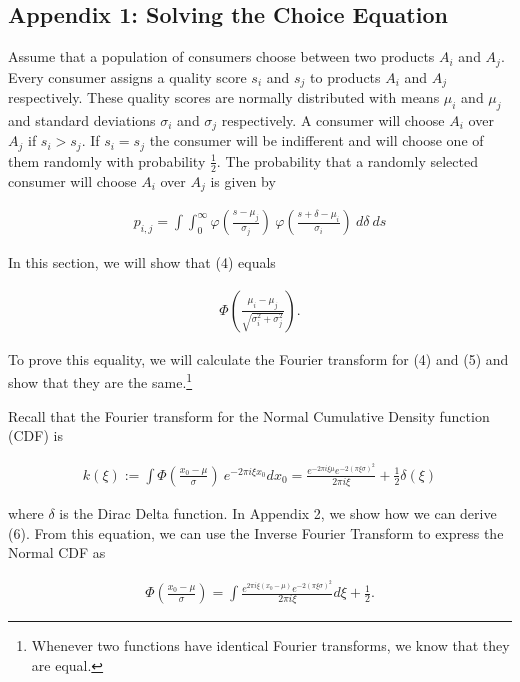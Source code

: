 \documentclass[]{article}
\begin{document}
\hypertarget{appendix-1-solving-the-choice-equation}{%
\subsection{Appendix 1: Solving the Choice
Equation}\label{appendix-1-solving-the-choice-equation}}

Assume that a population of consumers choose between two products
\(A_i\) and \(A_j\). Every consumer assigns a quality score \(s_i\) and
\(s_j\) to products \(A_i\) and \(A_j\) respectively. These quality
scores are normally distributed with means \(\mu_i\) and \(\mu_j\) and
standard deviations \(\sigma_i\) and \(\sigma_j\) respectively. A
consumer will choose \(A_i\) over \(A_j\) if \(s_i > s_j\). If
\(s_i = s_j\) the consumer will be indifferent and will choose one of
them randomly with probability \(\frac{1}{2}\). The probability that a
randomly selected consumer will choose \(A_i\) over \(A_j\) is given by

\begin{align}
p_{i,j} = \int \int_0^{\infty} \varphi(\frac{s - \mu_j}{\sigma_j})\ \varphi (\frac{s + \delta - \mu_i}{\sigma_i})\ d\delta\ ds
\end{align}

In this section, we will show that (4) equals

\begin{align}
\Phi (\frac{\mu_i - \mu_j}{\sqrt{\sigma_i^2 + \sigma_j^2}}).
\end{align}

To prove this equality, we will calculate the Fourier transform for (4)
and (5) and show that they are the same.\footnote{Whenever two functions
  have identical Fourier transforms, we know that they are equal. }

Recall that the Fourier transform for the Normal Cumulative Density
function (CDF) is

\begin{align}
k(\xi) := \int \Phi (\frac{x_0 - \mu}{\sigma})\ e^{-2 \pi i \xi x_0} d x_0 = \frac{e^{-2 \pi i \xi \mu} e^{-2(\pi \xi \sigma)^2}}{2 \pi i \xi} + \frac{1}{2}\delta(\xi)
\end{align}

where \(\delta\) is the Dirac Delta function. In Appendix 2, we show how
we can derive (6). From this equation, we can use the Inverse Fourier
Transform to express the Normal CDF as

\begin{align}
\Phi (\frac{x_0 - \mu}{\sigma}) = \int \frac{e^{2 \pi i \xi (x_0 - \mu)} e^{-2(\pi \xi \sigma)^2}}{2 \pi i \xi} d \xi + \frac{1}{2}.
\end{align}
\end{document}
